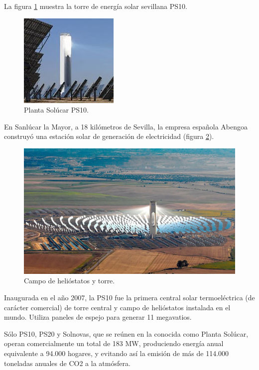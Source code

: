 La figura \ref{fig:FotosPaginasWebHeliostatos/unnamed(4).jpg} muestra la torre de energía solar sevillana PS10.

\begin{figure}[h!]
  	\centering
	\includegraphics[scale=1]{FotosPaginasWebHeliostatos/unnamed(4).jpg}
	\caption{Planta Solúcar PS10.
	\label{fig:FotosPaginasWebHeliostatos/unnamed(4).jpg}}
\end{figure}

En Sanlúcar la Mayor, a 18 kilómetros de Sevilla, la empresa española Abengoa construyó una estación solar de generación de electricidad (figura \ref{fig:FotosPaginasWebHeliostatos/unnamed(3).jpg}).

\begin{figure}[h!]
  	\centering
	\includegraphics[width=\textwidth]{FotosPaginasWebHeliostatos/unnamed(3).jpg}
	\caption{Campo de helióstatos y torre.
	\label{fig:FotosPaginasWebHeliostatos/unnamed(3).jpg}}
\end{figure}

Inaugurada en el año 2007, la PS10 fue la primera central solar termoeléctrica (de carácter comercial) de torre central y campo de helióstatos instalada en el mundo. Utiliza paneles de espejo para generar 11 megavatios.

Sólo PS10, PS20 y Solnovas, que se reúnen en la conocida como Planta Solúcar, operan comercialmente un total de 183 MW, produciendo energía anual equivalente a 94.000 hogares, y evitando así la emisión de más de 114.000 toneladas anuales de CO2 a la atmósfera.

